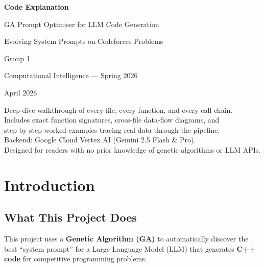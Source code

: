 \documentclass[11pt,a4paper]{report}
\begin{document}
\begin{titlepage}
\centering
\vspace*{2.5cm}
{\Huge\bfseries Code Explanation\par}
\vspace{0.8cm}
{\LARGE GA Prompt Optimiser for LLM Code Generation\par}
\vspace{1.2cm}
{\Large Evolving System Prompts on Codeforces Problems\par}
\vspace{2cm}
{\large Group 1\par}
\vspace{0.4cm}
{\large Computational Intelligence --- Spring 2026\par}
\vspace{1cm}
{\large April 2026\par}
\vfill
{\small
  Deep-dive walkthrough of every file, every function, and every call chain.\\[4pt]
  Includes exact function signatures, cross-file data-flow diagrams, and\\
  step-by-step worked examples tracing real data through the pipeline.\\[4pt]
  Backend: Google Cloud Vertex AI (Gemini 2.5 Flash \& Pro).\\
  Designed for readers with no prior knowledge of genetic algorithms or LLM APIs.
}
\end{titlepage}

\tableofcontents
\newpage

\chapter{Introduction}

\section{What This Project Does}

This project uses a \textbf{Genetic Algorithm (GA)} to automatically discover the best
``system prompt'' for a Large Language Model (LLM) that generates \textbf{C++ code}
for competitive programming problems.
\end{document}
